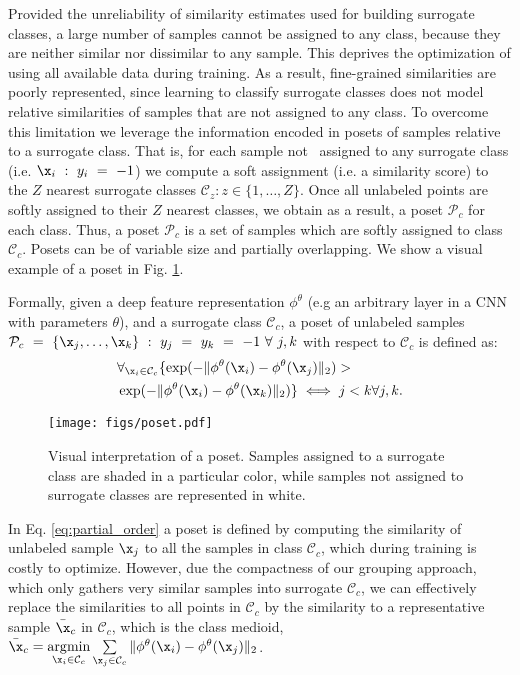 \documentclass[10pt,twocolumn,letterpaper]{article}
\DeclareMathOperator*{\argmin}{\arg\!\min}
\begin{document}
Provided the unreliability of similarity estimates used for building surrogate classes, a large number of samples cannot be assigned to any class, because they are neither similar nor dissimilar to any sample. This deprives the optimization of using all available data during training. As a result, fine-grained similarities are poorly represented, since learning to classify surrogate classes does not model relative similarities of samples that are not assigned to any class. To overcome this limitation we leverage the information encoded in posets of samples relative to a surrogate class. That is, for each sample not ~assigned to any surrogate class (i.e. $\x_i~:~y_i~=~-1$) we compute a soft assignment (i.e. a similarity score) to the $Z$ nearest surrogate classes $\mathcal{C}_z : z \in \{1, \dots, Z\}$. Once all unlabeled points are softly assigned to their $Z$ nearest classes, we obtain as a result, a poset $\mathcal{P}_c$ for each class. Thus, a poset $\mathcal{P}_c$ is a set of samples which are softly assigned to class $\mathcal{C}_c$. Posets can be of variable size and partially overlapping. We show a visual example of a poset in Fig. \ref{fig:poset}.




Formally, given a deep feature representation $\phi^\theta$ (e.g an arbitrary layer in a CNN with parameters $\theta$), and a surrogate class $\mathcal{C}_c$, a poset of unlabeled samples $\mathcal{P}_c~=~\{\x_j,\dots, \x_k\}~:~y_j~=~y_k~=~-1~\forall~j,k$  with respect to $\mathcal{C}_c$ is defined as:
\begin{alignat}{2}\label{eq:partial_order}
&\forall_{\x_i \in \mathcal{C}_c} \{ \exp(-\| \phi^\theta(\x_i) - \phi^\theta(\x_j) \|_2) > \nonumber \\ 
&\exp (-\| \phi^\theta(\x_i) - \phi^\theta(\x_k) \|_2) \} \iff j < k \forall j,k.
\end{alignat}

\begin{figure}[!t]
\texttt{[image: figs/poset.pdf]}
\caption{Visual interpretation of a poset. Samples assigned to a surrogate class are shaded in a particular color, while samples not assigned to surrogate classes are represented in white.}
\label{fig:poset}
\end{figure}


In Eq. \eqref{eq:partial_order} a poset is defined by computing the similarity of unlabeled sample $\x_j$ to all the samples in class $\mathcal{C}_c$, which during training is costly to optimize. However, due the compactness of our grouping approach, which only gathers very similar samples into surrogate $\mathcal{C}_c$, we can effectively replace the similarities to all points in $\mathcal{C}_c$ by the similarity to a representative sample $\bar{\x}_c$ in $\mathcal{C}_c$, which is the class medioid, $ \bar{\x}_c = \argmin\limits_{\x_i \in \mathcal{C}_c} \sum\limits_{\x_j \in \mathcal{C}_c} \|\phi^\theta(\x_i) - \phi^\theta(\x_j) \|_2$. 
\end{document}
